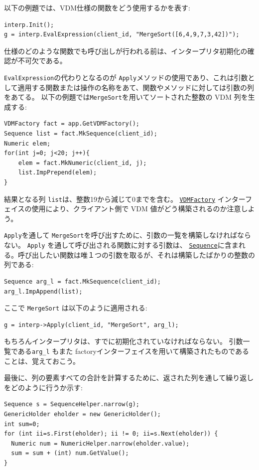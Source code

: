 \documentclass[\pformat,12pt]{jarticle}
\newcommand{\VDMFactory}{\hyperlink{interface.VDMFactory}{VDMFactory}}
\newcommand{\Sequence}{\hyperlink{interface.VDMSequence}{Sequence}}
\begin{document}
以下の例題では、VDM仕様の関数をどう使用するかを表す: 

\begin{verbatim}
interp.Init();
g = interp.EvalExpression(client_id, "MergeSort([6,4,9,7,3,42])");
\end{verbatim}

仕様のどのような関数でも呼び出しが行われる前は、インタープリタ初期化の確認が不可欠である。

{\tt EvalExpression}の代わりとなるのが {\tt  Apply}メソッドの使用であり、これは引数として適用する関数または操作の名称をあて、関数やメソッドに対しては引数の列をあてる。
以下の例題では{\tt MergeSort}を用いてソートされた整数の VDM 列を生成する:

\begin{verbatim}
VDMFactory fact = app.GetVDMFactory();
Sequence list = fact.MkSequence(client_id);
Numeric elem;
for(int j=0; j<20; j++){
    elem = fact.MkNumeric(client_id, j);
    list.ImpPrepend(elem);
}
\end{verbatim}                

結果となる列 {\tt list}は、整数19から減じて0までを含む。
 {\tt \VDMFactory} インターフェイスの使用により、クライアント側で VDM 値がどう構築されるのか注意しよう。

{\tt Apply}を通して {\tt MergeSort}を呼び出すために、引数の一覧を構築しなければならない。
{\tt Apply} を通して呼び出される関数に対する引数は、 {\tt \Sequence}に含まれる。呼び出したい関数は唯１つの引数を取るが、それは構築したばかりの整数の列である:

\begin{verbatim}
Sequence arg_l = fact.MkSequence(client_id);
arg_l.ImpAppend(list);
\end{verbatim}

ここで \texttt{MergeSort} は以下のように適用される:

\begin{verbatim}
g = interp->Apply(client_id, "MergeSort", arg_l);
\end{verbatim}

もちろんインタープリタは、すでに初期化されていなければならない。
引数一覧である{\tt arg\_l} もまた factoryインターフェイスを用いて構築されたものであることは、覚えておこう。

最後に、列の要素すべての合計を計算するために、返された列を通して繰り返しをどのように行うか示す:

\begin{verbatim}
Sequence s = SequenceHelper.narrow(g);
GenericHolder eholder = new GenericHolder();
int sum=0;
for (int ii=s.First(eholder); ii != 0; ii=s.Next(eholder)) {
  Numeric num = NumericHelper.narrow(eholder.value);
  sum = sum + (int) num.GetValue();
}
\end{verbatim}
\end{document}

